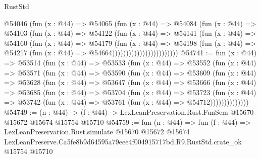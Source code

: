\begin{lexlean}{RustStd}
\begin{coremodule}
                              @54046
                                (fun (x : @44) =>
                                @54065
                                  (fun (x : @44) =>
                                  @54084
                                    (fun (x : @44) =>
                                    @54103
                                      (fun (x : @44) =>
                                      @54122
                                        (fun (x : @44) =>
                                        @54141
                                          (fun (x : @44) =>
                                          @54160
                                            (fun (x : @44) =>
                                            @54179
                                              (fun (x : @44) =>
                                              @54198
                                                (fun (x : @44) =>
                                                @54217
                                                  (fun (x : @44) => @54664))))))))))))))))))))))))
@54741 := fun (x : @44) =>
  @53514
    (fun (x : @44) =>
    @53533
      (fun (x : @44) =>
      @53552
        (fun (x : @44) =>
        @53571
          (fun (x : @44) =>
          @53590
            (fun (x : @44) =>
            @53609
              (fun (x : @44) =>
              @53628
                (fun (x : @44) =>
                @53647
                  (fun (x : @44) =>
                  @53666
                    (fun (x : @44) =>
                    @53685
                      (fun (x : @44) =>
                      @53704
                        (fun (x : @44) =>
                        @53723
                          (fun (x : @44) =>
                          @53742 (fun (x : @44) => @53761 (fun (x : @44) => @54712))))))))))))))
@54749 := (n : @44) ->
  (f : @44) -> LexLeanPreservation.Rust.FunSem @15670 @15672 @15674 @15754 @15710
@54759 := fun (n : @44) =>
  fun (f : @44) =>
  LexLeanPreservation.Rust.simulate
    @15670
    @15672
    @15674
    LexLeanPreserve.Ca5fe8b9d64595a79eee4f004915717bd.R9.RustStd.crate_ok
    @15754
    @15710
\end{coremodule}
\end{lexlean}

